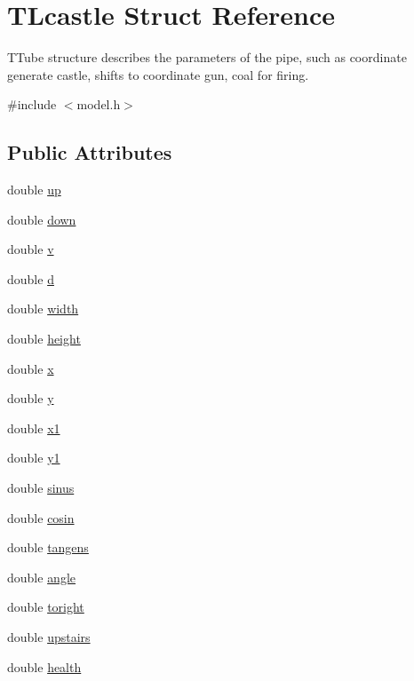 \hypertarget{struct_t_lcastle}{}\section{T\+Lcastle Struct Reference}
\label{struct_t_lcastle}


T\+Tube structure describes the parameters of the pipe, such as coordinate generate castle, shifts to coordinate gun, coal for firing.  




{\ttfamily \#include $<$model.\+h$>$}

\subsection*{Public Attributes}
\begin{DoxyCompactItemize}
\item 
double \hyperlink{struct_t_lcastle_adf64f614a549b14e54b7002f305cf6a6}{up}
\item 
double \hyperlink{struct_t_lcastle_a244b75b31e22fa23d057b35be4c31447}{down}
\item 
double \hyperlink{struct_t_lcastle_a2cd8f5c58a7823cfbf48767a6edac665}{v}
\item 
double \hyperlink{struct_t_lcastle_a17656e3c94fa799168beb6e5e89f7d0d}{d}
\item 
double \hyperlink{struct_t_lcastle_a88b2109bd0ed0f20b5cbfdc6be7b1eb8}{width}
\item 
double \hyperlink{struct_t_lcastle_afdb631a1ca3d69fcb9f2cf18bd113f1e}{height}
\item 
double \hyperlink{struct_t_lcastle_a3803e440a150db207c62e238b83fdbea}{x}
\item 
double \hyperlink{struct_t_lcastle_a38ca0e0f50130012db659383e82655ce}{y}
\item 
double \hyperlink{struct_t_lcastle_a8c12c4bd254741e7a5f48b1f905d7c4a}{x1}
\item 
double \hyperlink{struct_t_lcastle_a0aafc497ff39399c90028c0f52fc855d}{y1}
\item 
double \hyperlink{struct_t_lcastle_aa04a7c10bbca4dae20be4f72ee2a1268}{sinus}
\item 
double \hyperlink{struct_t_lcastle_a03a0cd8c4cfe056ffcc8400a318ff27c}{cosin}
\item 
double \hyperlink{struct_t_lcastle_a355c56ea0674586175ff4c712195d64e}{tangens}
\item 
double \hyperlink{struct_t_lcastle_ace89c8b9761bfbe1047c651b29f52c5a}{angle}
\item 
double \hyperlink{struct_t_lcastle_ab9483916901cdb9f1ffacae8c1356d53}{toright}
\item 
double \hyperlink{struct_t_lcastle_acd3309a127951fabdd5b0f77c059ce37}{upstairs}
\item 
double \hyperlink{struct_t_lcastle_a6682d2dcaa15a3456c64ec46e5904046}{health}
\end{DoxyCompactItemize}


